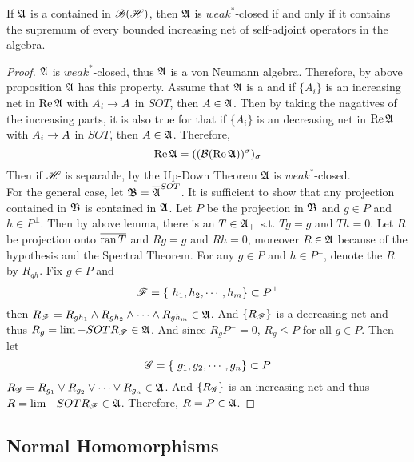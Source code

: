 \begin{thm} \label{thm16}
	If $\mathfrak{A}$ is a \Cs contained in $\mathscr{B(H)}$, then $\mathfrak{A}$ is $weak^*$-closed if and only if it contains the supremum of every bounded increasing net of self-adjoint operators in the algebra.
\end{thm}
\begin{proof}
	$\mathfrak{A}$ is $weak^*$-closed, thus $\mathfrak{A}$ is  a von Neumann algebra. Therefore, by above proposition $\mathfrak{A}$ has this property. Assume that $\mathfrak{A}$ is a \Cs and if $\{A_i\}$ is an increasing net in $\operatorname{Re}{\mathfrak{A}}$ with $A_i \rightarrow A$ in $SOT$, then $A \in \mathfrak{A}$. Then by taking the nagatives of the increasing parts, it is also true for that if $\{A_i\}$ is an decreasing net in $\operatorname{Re}{\mathfrak{A}}$ with $A_i \rightarrow A$ in $SOT$, then $A \in \mathfrak{A}$. Therefore, 
	\begin{equation*}
		\operatorname{Re}{\mathfrak{A}} = ((\mathcal{B}(\operatorname{Re}{\mathfrak{A}}))^{\sigma})_{\sigma}
	\end{equation*}
	Then if $\mathscr{H}$ is separable, by the Up-Down Theorem $\mathfrak{A}$ is $weak^*$-closed. \\
	For the general case, let $\mathfrak{B} = \overline{\mathfrak{A}}^{SOT}$. It is sufficient to show that any projection contained in $\mathfrak{B}$ is contained in $\mathfrak{A}$. Let $P$ be the projection in $\mathfrak{B}$ and $g \in P$ and $h \in P^{\bot}$. Then by above lemma, there is an $T \in \mathfrak{A}_+$ s.t. $Tg = g$ and $Th = 0$. Let $R$ be projection onto $\overline{\operatorname{ran}{T}}$ and $Rg = g$ and $Rh = 0$, moreover $R \in \mathfrak{A}$ because of the hypothesis and the Spectral Theorem. For any $g \in P$ and $h \in P^{\bot}$, denote the $R$ by $R_{gh}$. Fix $g \in P$ and 
	\begin{equation*}
		\mathscr{F} = \{~h_1, h_2, \cdots, h_m\} \subset P^{\bot}
	\end{equation*}
	then $R_{\mathscr{F}} = R_{gh_1} \wedge R_{gh_2} \wedge \cdots \wedge R_{gh_m} \in \mathfrak{A}$. And $\{R_{\mathscr{F}}\}$ is a decreasing net and thus $R_g = \lim-SOT R_{\mathscr{F}} \in \mathfrak{A}$. And since $R_g P^{\bot} = 0$, $R_g \leqslant P$ for all $g \in P$. Then let
	\begin{equation*}
		\mathscr{G} = \{~g_1, g_2, \cdots, g_n\} \subset P
	\end{equation*}
	$R_{\mathscr{G}} = R_{g_1} \vee R_{g_2} \vee \cdots \vee R_{g_n} \in \mathfrak{A}$. And $\{R_{\mathscr{G}}\}$ is an increasing net and thus $R = \lim-SOT R_{\mathscr{F}} \in \mathfrak{A}$. Therefore, $R = P \in \mathfrak{A}$.
\end{proof}

\subsection{Normal Homomorphisms}

